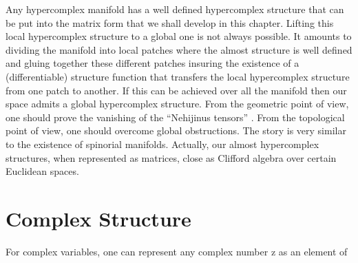 \documentclass[a4paper,12pt]{book}
\begin{document}
Any hypercomplex manifold has a well defined \coordHE{} hypercomplex
structure that can be put into the matrix form that we shall develop in this
chapter. Lifting this local hypercomplex structure to a global one is not
always possible. It amounts to dividing the manifold into local patches
where the almost structure is well defined and gluing together these
different patches insuring the existence of a (differentiable) structure
function that transfers the local hypercomplex structure from one patch to
another. If this can be achieved over all the manifold then our space admits
a global hypercomplex structure. From the geometric point of view, one
should prove the vanishing of the ``Nehijinus tensors'' \cite{yano}\cite
{marcha}. From the topological point of view, one should overcome global
obstructions. The story is very similar to the existence of spinorial
manifolds. Actually, our almost hypercomplex structures, when represented as
matrices, close as Clifford algebra over certain Euclidean spaces.

\section{Complex Structure}

For complex variables, one can represent any complex number z as an element
of \coordHE{}
\end{document}
